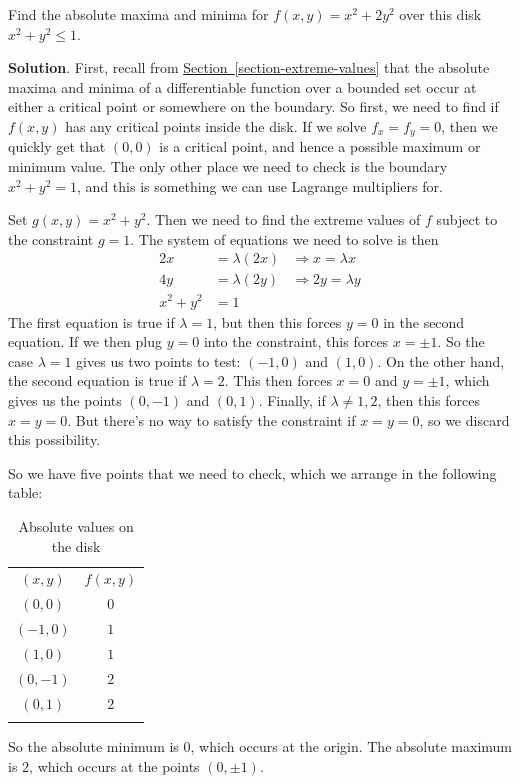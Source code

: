 \documentclass[10pt,]{book}
\theoremstyle{ptxplainnotitle}
\theoremstyle{ptxplaintitle}
\theoremstyle{ptxplainnotitle}
\theoremstyle{ptxplaintitle}
\theoremstyle{ptxplainnotitle}
\theoremstyle{ptxplaintitle}
\theoremstyle{ptxdefinitionnotitle}
\theoremstyle{ptxdefinitiontitle}
\theoremstyle{ptxdefinitionnotitle}
\theoremstyle{ptxdefinitiontitle}
\theoremstyle{ptxdefinitionnotitle}
\theoremstyle{ptxdefinitiontitle}
\theoremstyle{ptxdefinitionnotitle}
\theoremstyle{ptxdefinitiontitle}
\theoremstyle{ptxdefinitionnotitle}
\theoremstyle{ptxdefinitiontitle}
\numberwithin{equation}{section}
\newcommand{\hrulethin}  {\noalign{\hrule height 0.04em}}
\newcommand{\hrulethick} {\noalign{\hrule height 0.11em}}
\begin{document}
\begin{example}\label{example-extreme-values-on-a-paraboloid}
\hypertarget{p-1105}{}%
Find the absolute maxima and minima for \(f(x,y) = x^{2} + 2y^{2}\) over this disk \(x^{2} + y^{2} \leq 1\).%
\par\smallskip%
\noindent\textbf{Solution}.\hypertarget{solution-174}{}\quad%
\hypertarget{p-1106}{}%
First, recall from \hyperref[section-extreme-values]{Section~\ref{section-extreme-values}} that the absolute maxima and minima of a differentiable function over a bounded set occur at either a critical point or somewhere on the boundary. So first, we need to find if \(f(x,y)\) has any critical points inside the disk. If we solve \(f_{x} = f_{y} = 0\), then we quickly get that \((0,0)\) is a critical point, and hence a possible maximum or minimum value. The only other place we need to check is the boundary \(x^{2} + y^{2} = 1\), and this is something we can use Lagrange multipliers for.%
\par
\hypertarget{p-1107}{}%
Set \(g(x,y) = x^{2} + y^{2}\). Then we need to find the extreme values of \(f\) subject to the constraint \(g = 1\). The system of equations we need to solve is then%
\begin{align*}
2x & = \lambda(2x) & \Rightarrow x = \lambda x \\
4y & = \lambda(2y) & \Rightarrow 2y = \lambda y\\
x^{2} + y^{2} & = 1 
\end{align*}
The first equation is true if \(\lambda = 1\), but then this forces \(y = 0\) in the second equation. If we then plug \(y = 0\) into the constraint, this forces \(x = \pm1\). So the case \(\lambda=1\) gives us two points to test: \((-1,0)\) and \((1,0)\). On the other hand, the second equation is true if \(\lambda = 2\). This then forces \(x = 0\) and \(y = \pm 1\), which gives us the points \((0,-1)\) and \((0,1)\). Finally, if \(\lambda\neq1,2\), then this forces \(x = y = 0\). But there's no way to satisfy the constraint if \(x = y = 0\), so we discard this possibility.%
\par
\hypertarget{p-1108}{}%
So we have five points that we need to check, which we arrange in the following table: \leavevmode%
\begin{table}
\centering
\begin{tabular}{cc}\hrulethick
\((x,y)\)&\(f(x,y)\)\tabularnewline\hrulethin
\((0,0)\)&\(0\)\tabularnewline[0pt]
\((-1,0)\)&\(1\)\tabularnewline[0pt]
\((1,0)\)&\(1\)\tabularnewline[0pt]
\((0,-1)\)&\(2\)\tabularnewline[0pt]
\((0,1)\)&\(2\)\tabularnewline\hrulethick
\end{tabular}
\caption{Absolute values on the disk\label{table-lagrange-example-2}}
\end{table}
 So the absolute minimum is \(0\), which occurs at the origin. The absolute maximum is \(2\), which occurs at the points \((0,\pm1)\).%
\end{example}
\end{document}
